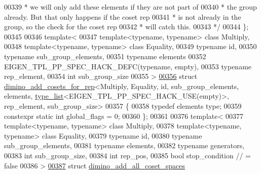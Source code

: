 \begin{DoxyCode}
00339 \textcolor{comment}{   * we will only add these elements if they are not part of}
00340 \textcolor{comment}{   * the group already. But that only happens if the coset rep}
00341 \textcolor{comment}{   * is not already in the group, so the check for the coset rep}
00342 \textcolor{comment}{   * will catch this.}
00343 \textcolor{comment}{   */}
00344 \};
00345 
00346 \textcolor{keyword}{template}<
00347   \textcolor{keyword}{template}<\textcolor{keyword}{typename}, \textcolor{keyword}{typename}> \textcolor{keyword}{class }Multiply,
00348   \textcolor{keyword}{template}<\textcolor{keyword}{typename}, \textcolor{keyword}{typename}> \textcolor{keyword}{class }Equality,
00349   \textcolor{keyword}{typename} id,
00350   \textcolor{keyword}{typename} sub\_group\_elements,
00351   \textcolor{keyword}{typename} elements
00352   EIGEN\_TPL\_PP\_SPEC\_HACK\_DEFC(\textcolor{keyword}{typename}, empty),
00353   \textcolor{keyword}{typename} rep\_element,
00354   \textcolor{keywordtype}{int} sub\_group\_size
00355 >
\hyperlink{struct_eigen_1_1internal_1_1group__theory_1_1dimino__add__cosets__for__rep_3_01_multiply_00_01_e1652444218b8671ae5ed0f27ebcae45c}{00356} \textcolor{keyword}{struct }\hyperlink{struct_eigen_1_1internal_1_1group__theory_1_1dimino__add__cosets__for__rep}{dimino\_add\_cosets\_for\_rep}<Multiply, Equality, id, sub\_group\_elements, 
      elements, \hyperlink{struct_eigen_1_1internal_1_1type__list}{type\_list}<EIGEN\_TPL\_PP\_SPEC\_HACK\_USE(empty)>, rep\_element, sub\_group\_size>
00357 \{
00358   \textcolor{keyword}{typedef} elements type;
00359   constexpr \textcolor{keyword}{static} \textcolor{keywordtype}{int} global\_flags = 0;
00360 \};
00361 
00376 \textcolor{keyword}{template}<
00377   \textcolor{keyword}{template}<\textcolor{keyword}{typename}, \textcolor{keyword}{typename}> \textcolor{keyword}{class }Multiply,
00378   \textcolor{keyword}{template}<\textcolor{keyword}{typename}, \textcolor{keyword}{typename}> \textcolor{keyword}{class }Equality,
00379   \textcolor{keyword}{typename} id,
00380   \textcolor{keyword}{typename} sub\_group\_elements,
00381   \textcolor{keyword}{typename} elements,
00382   \textcolor{keyword}{typename} generators,
00383   \textcolor{keywordtype}{int} sub\_group\_size,
00384   \textcolor{keywordtype}{int} rep\_pos,
00385   \textcolor{keywordtype}{bool} stop\_condition        \textcolor{comment}{// = false}
00386 >
\hyperlink{struct_eigen_1_1internal_1_1group__theory_1_1dimino__add__all__coset__spaces}{00387} \textcolor{keyword}{struct }\hyperlink{struct_eigen_1_1internal_1_1group__theory_1_1dimino__add__all__coset__spaces}{dimino\_add\_all\_coset\_spaces}

\end{DoxyCode}

